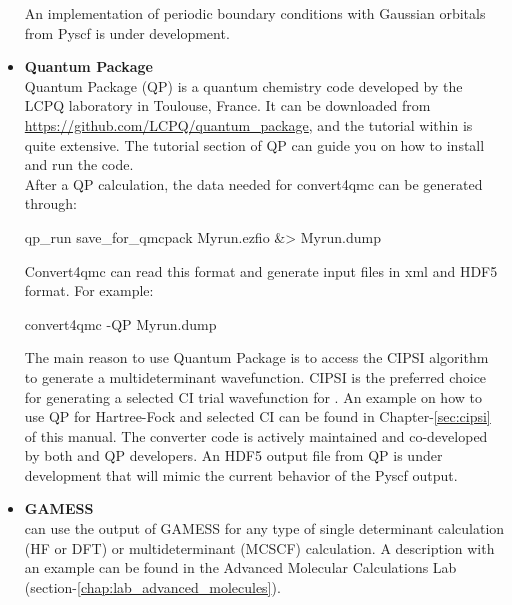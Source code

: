 \begin{itemize}
\begin{itemize}
\end{itemize}

 An implementation of periodic boundary conditions with Gaussian orbitals from Pyscf is under development. 

\item \textbf{Quantum Package}\\
Quantum Package\cite{QP} (QP) is a quantum chemistry code developed by the LCPQ laboratory in Toulouse, France. It can be downloaded from \url{https://github.com/LCPQ/quantum_package}, and the tutorial within is quite extensive. The tutorial section of QP can guide you on how to install and run the code.\\
After a QP calculation, the data needed for convert4qmc can be generated through:\\
\begin{shade}
 qp_run save_for_qmcpack Myrun.ezfio &> Myrun.dump
\end{shade}

Convert4qmc can read this format and generate \qmcpack input files in xml and HDF5 format.  For example:

\begin{shade}
 convert4qmc -QP Myrun.dump
\end{shade}


The main reason to use Quantum Package is to access the CIPSI algorithm to generate a multideterminant wavefunction.
CIPSI is the preferred choice for generating a selected CI trial wavefunction for \qmcpack.
An example on how to use QP for Hartree-Fock and selected CI can be found in Chapter-\ref{sec:cipsi}  of this manual.
The converter code is actively maintained and co-developed by both \qmcpack and QP developers.
An HDF5 output file from QP is under development that will mimic the current behavior of the Pyscf output.  


\item \textbf{GAMESS}\\
\qmcpack can use the output of GAMESS\cite{schmidt93} for any type of single determinant calculation (HF or DFT) or multideterminant (MCSCF) calculation. A description with an example can be found in the Advanced Molecular Calculations Lab (section-\ref{chap:lab_advanced_molecules}).
\end{itemize}

